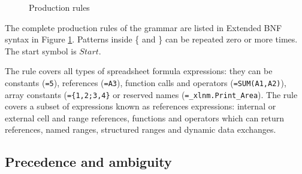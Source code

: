 \begin{figure}
\small
\begin{multicols*}{2}

\end{multicols*}
\caption{Production rules}
\label{figure:productions}
\end{figure}

The complete production rules of the grammar are listed in Extended BNF syntax in Figure \ref{figure:productions}.
Patterns inside \{ and \} can be repeated zero or more times.
The start symbol is $Start$.

The  rule covers all types of spreadsheet formula expressions: they can be constants (\texttt{=5}), references (\texttt{=A3}), function calls and operators (\texttt{=SUM(A1,A2)}), array constants (\texttt{=\{1,2;3,4\}} or reserved names (\texttt{=_xlnm.Print_Area}).
The  rule covers a subset of expressions known as references expressions: internal or external cell and range references, functions and operators which can return references, named ranges, structured ranges and dynamic data exchanges.

%	
%
%	

\subsection{Precedence and ambiguity}
\label{sec:ambiguity}

